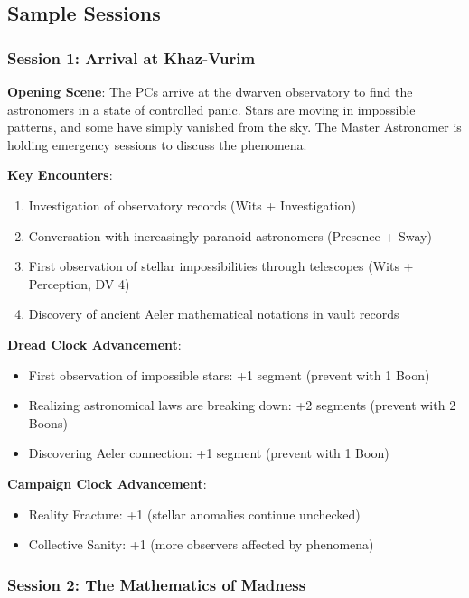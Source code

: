 \documentclass[11pt]{article}
\begin{document}
\subsection*{Sample Sessions}

\subsubsection*{Session 1: Arrival at Khaz-Vurim}

\textbf{Opening Scene}: The PCs arrive at the dwarven observatory to find the astronomers in a state of controlled panic. Stars are moving in impossible patterns, and some have simply vanished from the sky. The Master Astronomer is holding emergency sessions to discuss the phenomena.

\textbf{Key Encounters}:
\begin{enumerate}[leftmargin=*]
\item Investigation of observatory records (Wits + Investigation)
\item Conversation with increasingly paranoid astronomers (Presence + Sway)
\item First observation of stellar impossibilities through telescopes (Wits + Perception, DV 4)
\item Discovery of ancient Aeler mathematical notations in vault records
\end{enumerate}

\textbf{Dread Clock Advancement}: 
\begin{itemize}[leftmargin=*]
\item First observation of impossible stars: +1 segment (prevent with 1 Boon)
\item Realizing astronomical laws are breaking down: +2 segments (prevent with 2 Boons)
\item Discovering Aeler connection: +1 segment (prevent with 1 Boon)
\end{itemize}

\textbf{Campaign Clock Advancement}:
\begin{itemize}[leftmargin=*]
\item Reality Fracture: +1 (stellar anomalies continue unchecked)
\item Collective Sanity: +1 (more observers affected by phenomena)
\end{itemize}

\subsubsection*{Session 2: The Mathematics of Madness}
\end{document}
